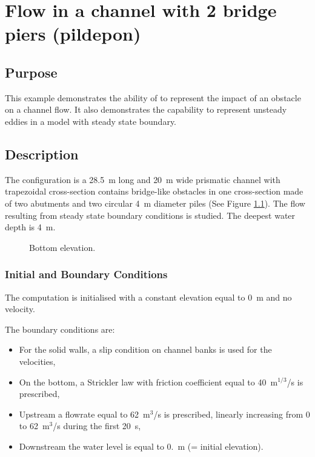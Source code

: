 \chapter{Flow in a channel with 2 bridge piers (pildepon)}

\section{Purpose}

This example demonstrates the ability of  to represent
the impact of an obstacle on a channel flow.
It also demonstrates the capability to represent unsteady eddies in a
model with steady state boundary.

\section{Description}

The configuration is a 28.5~m long and 20~m wide prismatic channel with
trapezoidal cross-section contains bridge-like obstacles in one cross-section
made of two abutments and two circular 4~m diameter piles
(See Figure \ref{t3d:pildepon:fig:Bottom}).
The flow resulting from steady state boundary conditions is studied.
The deepest water depth is 4~m.

\begin{figure}[!htbp]
 \centering
 \caption{Bottom elevation.}
 \label{t3d:pildepon:fig:Bottom}
\end{figure}

\subsection{Initial and Boundary Conditions}

The computation is initialised with a constant elevation equal to 0~m
and no velocity.

The boundary conditions are:
\begin{itemize}
\item For the solid walls, a slip condition on channel banks is used for the
velocities,
\item On the bottom, a Strickler law with friction coefficient equal to
40~m$^{1/3}$/s is prescribed,
\item Upstream a flowrate equal to 62~m$^3$/s is prescribed,
linearly increasing from 0 to 62~m$^3$/s during the first 20~s,
\item Downstream the water level is equal to 0.~m (= initial elevation).
\end{itemize}

